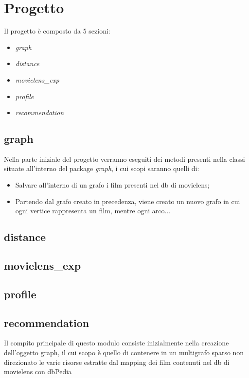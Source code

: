 \section{Progetto}
\label{project}
Il progetto è composto da 5 sezioni:
\begin{itemize}
\item\emph{graph}
\item\emph{distance}
\item\emph{movielens\_exp}
\item\emph{profile}
\item\emph{recommendation}
\end{itemize}
\subsection{graph}
Nella parte iniziale del progetto verranno eseguiti dei metodi presenti nella classi situate all'interno del package \emph{graph}, i cui scopi saranno quelli di: 
\begin{itemize}
\item Salvare all'interno di un grafo i film presenti nel db di movielens;
\item Partendo dal grafo creato in precedenza, viene creato un nuovo grafo in cui ogni vertice rappresenta un film, mentre ogni arco...
\end{itemize}
\subsection{distance}
\subsection{movielens\_exp}
\subsection{profile}
\subsection{recommendation}


Il compito principale di questo modulo consiste inizialmente nella creazione dell'oggetto graph, il cui scopo è quello di contenere in un multigrafo sparso non direzionato le varie risorse estratte dal mapping dei film contenuti nel db di movielens con dbPedia

